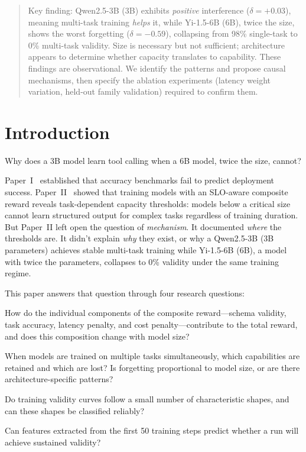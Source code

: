\documentclass[11pt]{article}
\begin{document}
\begin{abstract}
Key finding: Qwen2.5-3B (3B) exhibits \emph{positive} interference ($\delta = +0.03$), meaning multi-task training \emph{helps} it, while Yi-1.5-6B (6B), twice the size, shows the worst forgetting ($\delta = -0.59$), collapsing from 98\% single-task to 0\% multi-task validity.  Size is necessary but not sufficient; architecture appears to determine whether capacity translates to capability.  These findings are observational.  We identify the patterns and propose causal mechanisms, then specify the ablation experiments (latency weight variation, held-out family validation) required to confirm them.
\end{abstract}

\section{Introduction}

Why does a 3B model learn tool calling when a 6B model, twice the size, cannot?

Paper~I~\cite{maloney2025deploymentgap} established that accuracy benchmarks fail to predict deployment success.  Paper~II~\cite{maloney2025capacity} showed that training models with an SLO-aware composite reward reveals task-dependent capacity thresholds: models below a critical size cannot learn structured output for complex tasks regardless of training duration.  But Paper~II left open the question of \emph{mechanism}.  It documented \emph{where} the thresholds are.  It didn't explain \emph{why} they exist, or why a Qwen2.5-3B (3B parameters) achieves stable multi-task training while Yi-1.5-6B (6B), a model with twice the parameters, collapses to 0\% validity under the same training regime.

This paper answers that question through four research questions:

\begin{description}[leftmargin=*]
\item[RQ1: Reward Decomposition.] How do the individual components of the composite reward---schema validity, task accuracy, latency penalty, and cost penalty---contribute to the total reward, and does this composition change with model size?

\item[RQ2: Forgetting Patterns.] When models are trained on multiple tasks simultaneously, which capabilities are retained and which are lost? Is forgetting proportional to model size, or are there architecture-specific patterns?

\item[RQ3: Curve Taxonomy.] Do training validity curves follow a small number of characteristic shapes, and can these shapes be classified reliably?

\item[RQ3+: Early Prediction.] Can features extracted from the first 50 training steps predict whether a run will achieve sustained validity?
\end{description}
\end{document}
